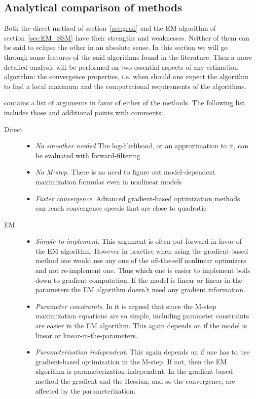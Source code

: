 
\subsection{Analytical comparison of methods}

Both the direct method of section~\ref{sec:grad} and the EM algorithm of section~\ref{sec:EM_SSM}
have their strengths and weaknesses. Neither of them can be said to eclipse the other in an absolute sense.
In this section we will go through some features of the said algorithms found in the literature.
Then a more detailed analysis will be performed on two essential aspects of any estimation algorithm:
the convergence properties, i.e. when should one expect the algorithm to find a local maximum and
the computational requirements of the algorithms.

\textcite{Cappe2005} contains a list of arguments in favor of either of the methods. The following list includes
those and additional points with comments:
\begin{description}
  \item[Direct]\hfill
\begin{itemize}
  \item\emph{No smoother needed} The log-likelihood, or an approximation to it, can be evaluated
  with forward-filtering
  \item\emph{No M-step}. There is no need to figure out model-dependent maximization
  formulas even in nonlinear models 
  \item\emph{Faster convergence}. Advanced gradient-based optimization
  methods can reach convergence speeds that are close to quadratic
\end{itemize}
  \item[EM]\hfill
  \begin{itemize}
  \item \emph{Simple to implement}. This argument is often put forward in favor of the EM
 algorithm. However in practice when using the gradient-based method one would use any one of
the off-the-self nonlinear optimizers and not re-implement one. Thus which one is easier to implement
boils down to gradient computation. If the model is linear or linear-in-the-parameters the EM
algorithm doesn't need any gradient information.
  \item\emph{Parameter constraints}. In \textcite{Cappe2005} it is argued that
since the M-step maximization equations are so simple, including parameter constraints
are easier in the EM algorithm. This again depends on if the model is linear or linear-in-the-parameters.
  \item\emph{Parameterization independent}. This again depends on if one has to use gradient-based
 optimization in the M-step. If not, then the EM algorithm is parameterization independent. In the gradient-based
 method the gradient and the Hessian, and so the convergence, are affected by the parameterization.
\end{itemize} 
\end{description}

